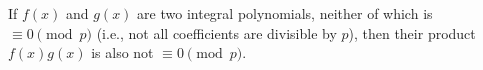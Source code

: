 If $f(x)$ and $g(x)$ are two integral polynomials, neither of which is $\equiv 0 \pmod{p}$ (i.e., not all coefficients are divisible by $p$), then their product $f(x)g(x)$ is also not $\equiv 0 \pmod{p}$.
